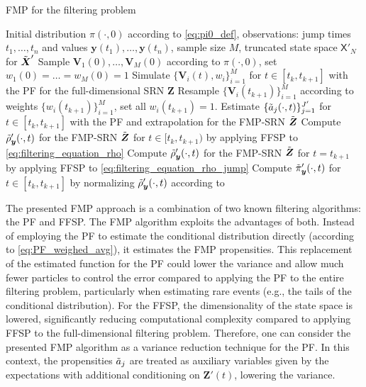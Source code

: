 \begin{algorithm}[H]
\caption{\ac{FMP} for the filtering problem}
\label{alg:FMP_FFSP}
\begin{algorithmic}[1]
    \Require Initial distribution $\pi(\cdot, 0)$ according to \eqref{eq:pi0_def}, observations: jump times $t_1, \dots, t_n$ and values $\boldsymbol{y}(t_1), \dots, \boldsymbol{y}(t_n)$, sample size $M$, truncated state space $\mathsf{X}'_N$ for $\Tilde{\boldsymbol{X}}'$
    \State Sample $\boldsymbol{V}_1(0), \dots, \boldsymbol{V}_M(0)$ according to $\pi(\cdot, 0)$, set $w_1(0) = \dots = w_M(0) = 1$
        \State Simulate $\{ \boldsymbol{V}_i(t), w_i \}_{i=1}^{M}$ for $t \in [t_k, t_{k+1}]$ with the \ac{PF} \cite{Rathinam2021PFwithExactState} for the full-dimensional \ac{SRN} $\boldsymbol{Z}$ 
        \State Resample $\{\boldsymbol{V}_i(t_{k+1})\}_{i=1}^{M}$ according to weights $\{w_i(t_{k+1})\}_{i=1}^{M}$, set all $w_i(t_{k+1}) = 1$.
        \State Estimate $\{\Tilde{a}_j (\cdot, t) \}_{j=1}^{J'}$ for $t \in [t_k, t_{k+1}]$ with the \ac{PF} and extrapolation for the \ac{FMP}-\ac{SRN} $\Tilde{\boldsymbol{Z}}$ 
        \State Compute $\Tilde{\rho}_{\boldsymbol{y}}'(\cdot, t)$  for the \ac{FMP}-\ac{SRN} $\Tilde{\boldsymbol{Z}}$ for $t \in [t_k, t_{k+1})$ by applying \ac{FFSP} to \eqref{eq:filtering_equation_rho}
        \State Compute $\Tilde{\rho}_{\boldsymbol{y}}'(\cdot, t)$  for the \ac{FMP}-\ac{SRN} $\Tilde{\boldsymbol{Z}}$ for $t = t_{k+1}$ by applying \ac{FFSP} to \eqref{eq:filtering_equation_rho_jump}
        \State Compute $\Tilde{\pi}_{\boldsymbol{y}}'(\cdot, t)$ for $t \in [t_k, t_{k+1}]$ by normalizing  $\Tilde{\rho}_{\boldsymbol{y}}'(\cdot, t)$ according to  \cite{DAmbrosio2022FFSP}
    \EndFor
\end{algorithmic}
\end{algorithm}



The presented \ac{FMP} approach is a combination of two known filtering algorithms: the \ac{PF} and \ac{FFSP}. The \ac{FMP} algorithm  exploits the advantages of both. Instead of employing the \ac{PF} to  estimate the conditional distribution directly (according to \eqref{eq:PF_weighed_avg}), it estimates the \ac{FMP} propensities. This replacement of the estimated function for the \ac{PF} could lower the variance and allow much fewer particles to control the error compared to applying the \ac{PF} to the entire filtering problem, particularly when estimating rare events (e.g., the tails of the conditional distribution). For the \ac{FFSP}, the dimensionality of the state space is lowered, significantly reducing computational complexity compared to applying \ac{FFSP} to the full-dimensional filtering problem. Therefore, one can consider the presented \ac{FMP} algorithm as a variance reduction technique for the \ac{PF}. In this context, the propensities $\Tilde{a}_j$ are treated as auxiliary variables given by the expectations with additional conditioning on $\boldsymbol{Z}'(t)$, lowering the variance. 


